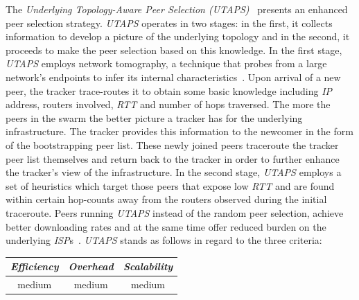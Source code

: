 The \emph{Underlying Topology-Aware Peer Selection (UTAPS)}~\cite{LCY2008}
presents an enhanced peer selection strategy. 
\emph{UTAPS} operates in two stages: in the first,
it collects information to develop a picture of the underlying topology 
and in the second, it proceeds to make the peer selection based on 
this knowledge. In the first stage, \emph{UTAPS} employs
network tomography, a technique that probes from a large network's 
endpoints to infer its internal characteristics~\cite{chny_tomography_2002}. 
Upon arrival of a new peer, the tracker trace-routes 
it to obtain some basic knowledge 
including \emph{IP} address, routers involved, \emph{RTT} and number of 
hops traversed.
The more the peers in the swarm the better 
picture a tracker has for the underlying infrastructure.  
The tracker provides this information to the newcomer in the form
of the bootstrapping peer list. 
These newly joined peers traceroute the tracker
peer list themselves and return back to the tracker in order to further enhance
the tracker's view of the infrastructure.
In the second stage, \emph{UTAPS} employs a set of heuristics
which target those peers that expose low \emph{RTT} and are found within
certain hop-counts away from
the routers observed during the initial traceroute.
Peers running \emph{UTAPS}
instead of the random peer selection, achieve better downloading rates
and at the same time offer reduced burden on the underlying \emph{ISP}s~\cite{LCY2008}. 
\emph{UTAPS} stands as follows in regard to the three criteria:
\begin{center}
{\footnotesize
\begin{tabular}{ccc}
\emph{Efficiency} & \emph{Overhead} & \emph{Scalability} \\
\hline
medium &
medium &
%
medium
\end{tabular}
}
\end{center}

